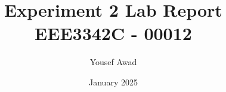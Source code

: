 

\documentclass{article}
\usepackage{graphicx} %
\usepackage{varwidth}
\usepackage{listings}
\usepackage{xcolor}

\title{Experiment 2 Lab Report \\ \large EEE3342C - 00012}
\author{Yousef Awad}
\date{January 2025}
\setcounter{secnumdepth}{0}




\maketitle
\tableofcontents
\newpage

\section{Equipment}
For this experiment a computer running Linux 6.12.13 was used alongside the Xilinx Vivado 2024.2 software, alongside an FPGA board, the BASYS 3 development board. The board specifically only used to ensure the simulation by the Vivado software was accurate in the real world, as well as to verify the simulation software wasn't incorrect.
\section{Objective}
